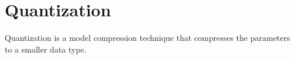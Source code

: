 \section{Quantization}
Quantization is a model compression technique that compresses the parameters to a smaller data type. 
